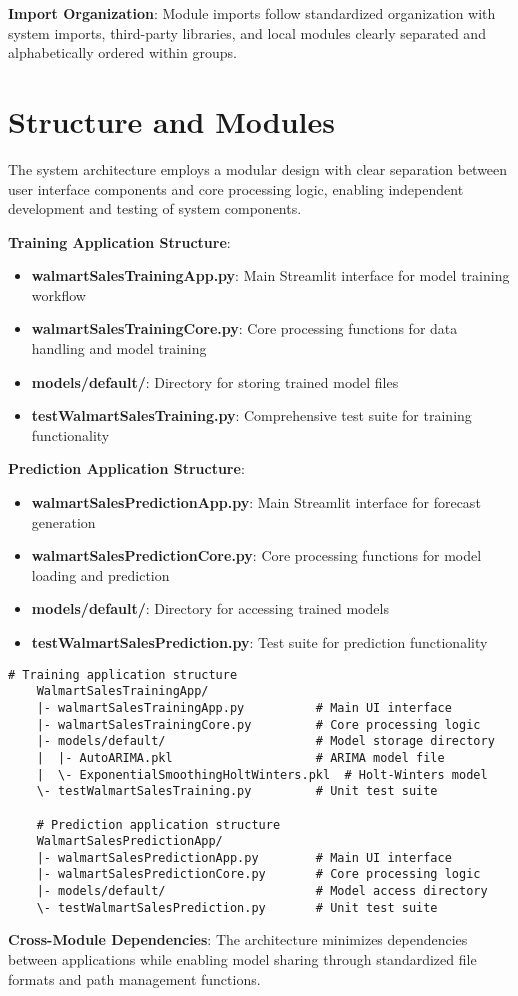 \textbf{Import Organization}: Module imports follow standardized organization with system imports, third-party libraries, and local modules clearly separated and alphabetically ordered within groups.

\section{Structure and Modules}

The system architecture employs a modular design with clear separation between user interface components and core processing logic, enabling independent development and testing of system components.

\textbf{Training Application Structure}:
\begin{itemize}
	\item \textbf{walmartSalesTrainingApp.py}: Main Streamlit interface for model training workflow
	\item \textbf{walmartSalesTrainingCore.py}: Core processing functions for data handling and model training
	\item \textbf{models/default/}: Directory for storing trained model files
	\item \textbf{testWalmartSalesTraining.py}: Comprehensive test suite for training functionality
\end{itemize}

\textbf{Prediction Application Structure}:
\begin{itemize}
	\item \textbf{walmartSalesPredictionApp.py}: Main Streamlit interface for forecast generation
	\item \textbf{walmartSalesPredictionCore.py}: Core processing functions for model loading and prediction
	\item \textbf{models/default/}: Directory for accessing trained models
	\item \textbf{testWalmartSalesPrediction.py}: Test suite for prediction functionality
\end{itemize}

\begin{lstlisting}[style=bashstyle, caption={Module Structure and Dependencies}]
	# Training application structure
	WalmartSalesTrainingApp/
	|- walmartSalesTrainingApp.py          # Main UI interface
	|- walmartSalesTrainingCore.py         # Core processing logic
	|- models/default/                     # Model storage directory
	|  |- AutoARIMA.pkl                    # ARIMA model file
	|  \- ExponentialSmoothingHoltWinters.pkl  # Holt-Winters model
	\- testWalmartSalesTraining.py         # Unit test suite
	
	# Prediction application structure  
	WalmartSalesPredictionApp/
	|- walmartSalesPredictionApp.py        # Main UI interface
	|- walmartSalesPredictionCore.py       # Core processing logic
	|- models/default/                     # Model access directory
	\- testWalmartSalesPrediction.py       # Unit test suite
\end{lstlisting}
\textbf{Cross-Module Dependencies}: The architecture minimizes dependencies between applications while enabling model sharing through standardized file formats and path management functions.


